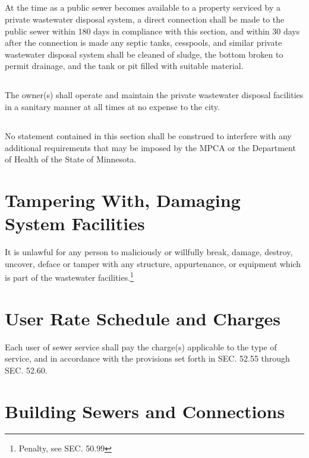 \subsection{}
At the time as a public sewer becomes available to a property serviced by a private wastewater disposal system, a direct connection shall be made to the public sewer within 180 days in compliance with this section, and within 30 days after the connection is made any septic tanks, cesspools, and similar private wastewater disposal system shall be cleaned of sludge, the bottom broken to permit drainage, and the tank or pit filled with suitable material.
\subsection{}
The owner(s) shall operate and maintain the private wastewater disposal facilities in a sanitary manner at all times at no expense to the city.
\subsection{}
No statement contained in this section shall be construed to interfere with any additional requirements that may be imposed by the MPCA or the Department of Health of the State of Minnesota.

\section{Tampering With, Damaging System Facilities}
It is unlawful for any person to maliciously or willfully break, damage, destroy, uncover, deface or tamper with any structure, appurtenance, or equipment which is part of the wastewater facilities.\footnote{Penalty, see SEC. 50.99}

\section{User Rate Schedule and Charges}
Each user of sewer service shall pay the charge(s) applicable to the type of service, and in accordance with the provisions set forth in SEC. 52.55 through SEC. 52.60.\\



\setcounter{section}{14}
\section{Building Sewers and Connections}

